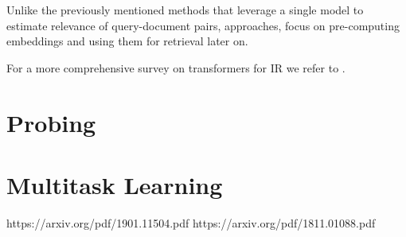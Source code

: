 Unlike the previously mentioned methods that leverage a single model to estimate relevance of query-document pairs,  approaches, focus on pre-computing embeddings and using them for retrieval later on.

For a more comprehensive survey on transformers for IR we refer to \cite{10.1145/3437963.3441667}.

\section{Probing}

\section{Multitask Learning}
https://arxiv.org/pdf/1901.11504.pdf
https://arxiv.org/pdf/1811.01088.pdf